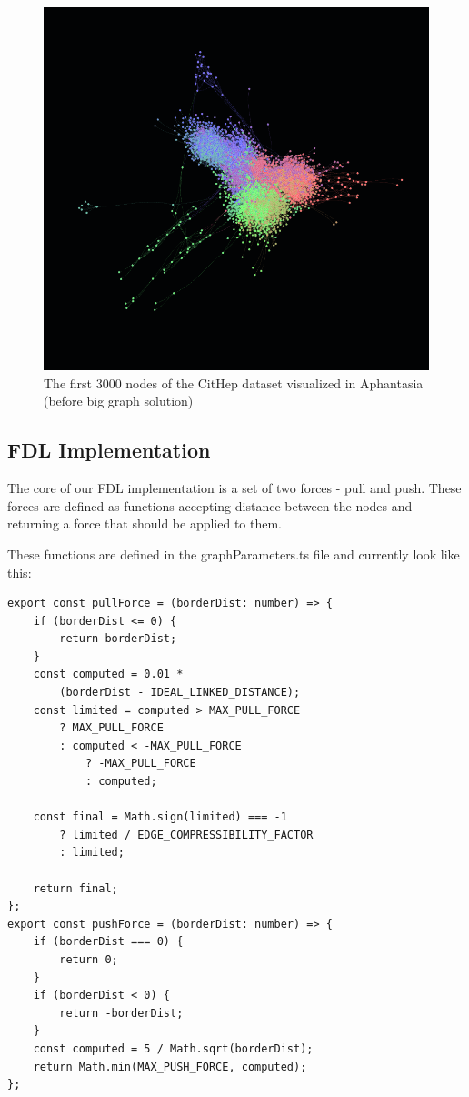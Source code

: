 \begin{figure}[p]\centering
    \includegraphics[width=140mm, keepaspectratio]{img/Afantazie_cithep_3000.png}
    \caption{The first 3000 nodes of the CitHep dataset visualized in Aphantasia (before big graph solution)}
    \label{obr:afantazie_cithep_3k}
\end{figure}

\subsection{FDL Implementation}

The core of our FDL implementation is a set of two forces - pull and push.
These forces are defined as functions accepting distance between the nodes and returning a force that should be applied to them.

These functions are defined in the graphParameters.ts file and currently look like this:
\begin{lstlisting}
export const pullForce = (borderDist: number) => {
    if (borderDist <= 0) {
        return borderDist;
    }
    const computed = 0.01 *
        (borderDist - IDEAL_LINKED_DISTANCE);
    const limited = computed > MAX_PULL_FORCE
        ? MAX_PULL_FORCE
        : computed < -MAX_PULL_FORCE
            ? -MAX_PULL_FORCE
            : computed;

    const final = Math.sign(limited) === -1
        ? limited / EDGE_COMPRESSIBILITY_FACTOR
        : limited;

    return final;
};
export const pushForce = (borderDist: number) => {
    if (borderDist === 0) {
        return 0;
    }
    if (borderDist < 0) {
        return -borderDist;
    }
    const computed = 5 / Math.sqrt(borderDist);
    return Math.min(MAX_PUSH_FORCE, computed);
};
\end{lstlisting}

